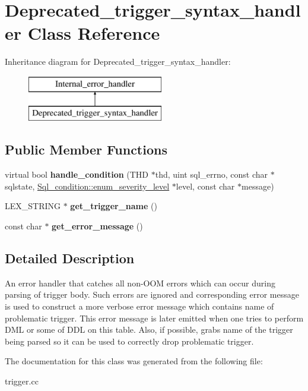 \hypertarget{classDeprecated__trigger__syntax__handler}{}\section{Deprecated\+\_\+trigger\+\_\+syntax\+\_\+handler Class Reference}
\label{classDeprecated__trigger__syntax__handler}
Inheritance diagram for Deprecated\+\_\+trigger\+\_\+syntax\+\_\+handler\+:\begin{figure}[H]
\begin{center}
\leavevmode
\includegraphics[height=2.000000cm]{classDeprecated__trigger__syntax__handler}
\end{center}
\end{figure}
\subsection*{Public Member Functions}
\begin{DoxyCompactItemize}
\item 
\mbox{\label{classDeprecated__trigger__syntax__handler_ace98671a088293d8bce57608c34585bb}} 
virtual bool {\bfseries handle\+\_\+condition} (T\+HD $\ast$thd, uint sql\+\_\+errno, const char $\ast$sqlstate, \mbox{\hyperlink{classSql__condition_ab0602581e19cddb609bfe10c44be4e83}{Sql\+\_\+condition\+::enum\+\_\+severity\+\_\+level}} $\ast$level, const char $\ast$message)
\item 
\mbox{\label{classDeprecated__trigger__syntax__handler_a04609466fe737a1432eca48fce0a8a4f}} 
L\+E\+X\+\_\+\+S\+T\+R\+I\+NG $\ast$ {\bfseries get\+\_\+trigger\+\_\+name} ()
\item 
\mbox{\label{classDeprecated__trigger__syntax__handler_af72cd2027f5d2025dc144e1e9ec4e6e9}} 
const char $\ast$ {\bfseries get\+\_\+error\+\_\+message} ()
\end{DoxyCompactItemize}


\subsection{Detailed Description}
An error handler that catches all non-\/O\+OM errors which can occur during parsing of trigger body. Such errors are ignored and corresponding error message is used to construct a more verbose error message which contains name of problematic trigger. This error message is later emitted when one tries to perform D\+ML or some of D\+DL on this table. Also, if possible, grabs name of the trigger being parsed so it can be used to correctly drop problematic trigger. 

The documentation for this class was generated from the following file\+:\begin{DoxyCompactItemize}
\item 
trigger.\+cc\end{DoxyCompactItemize}
